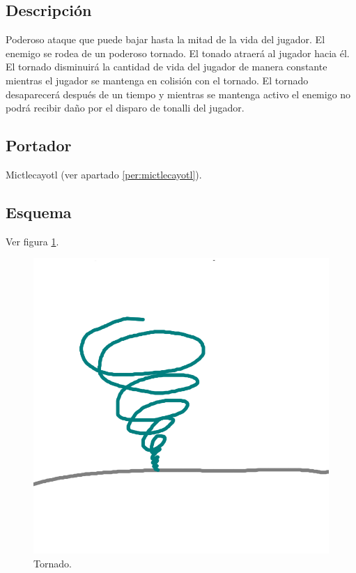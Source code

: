 \subsection{Descripción}
Poderoso ataque que puede bajar hasta la mitad de la vida del jugador. El enemigo se rodea de un poderoso tornado. El tonado atraerá al jugador hacia él. El tornado disminuirá la cantidad de vida del jugador de manera constante mientras el jugador se mantenga en colisión con el tornado. El tornado desaparecerá después de un tiempo y mientras se mantenga activo el enemigo no podrá recibir daño por el disparo de tonalli del jugador.
\subsection{Portador}
Mictlecayotl (ver apartado \ref{per:mictlecayotl}).
\subsection{Esquema}
			Ver figura \ref{fig:tornado}.
			\begin{figure}
				\centering
				\includegraphics[height=0.2 \textheight]{Imagenes/tornado}
				\caption{Tornado.}
				\label{fig:tornado}
			\end{figure}

